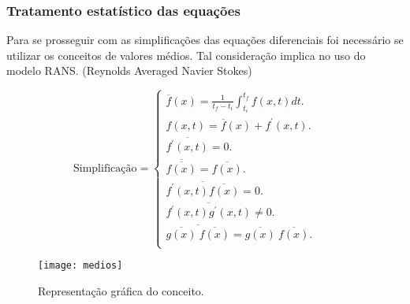 \documentclass[xcolor=dvipsnames,10pt,aspectratio=169]{beamer}
\begin{document}
		
		
		\begin{frame}
			\frametitle{Tratamento estatístico das equações}
			Para se prosseguir com as simplificações das equações diferenciais foi necessário se utilizar os conceitos de valores médios. Tal consideração implica no uso do modelo RANS. (Reynolds Averaged Navier Stokes)
			\\
			\begin{minipage}[h!]{0.45\textwidth}
				\begin{equation*}
				\label{ola}
				\text{Simplificação}=
				\begin{cases}
				\overline{f}({x})=\frac{1}{t_f - t_i} \int_{t_i}^{t_f} f({x} , t) dt.      & \quad  \\
				f({x} , t) = \overline{f}({x}) + f^\prime ({x} ,t) . & \quad   \\
				\overline{f^\prime ({x} ,t)} = 0 . & \quad   \\
				\overline{\overline{f({x})}} = \overline{f({x})} . & \quad   \\
				\overline{f^\prime ({x} ,t)\overline{f({x})}} = 0 .& \quad   \\
				\overline{f^\prime ({x} ,t)g^\prime ({x} ,t)} \neq 0 . & \quad   \\
				\overline{  \overline{g({x})} \ \overline{f({x})}  } = {\overline{g({x})}} \ {\overline{f({x})}} . & \quad   \\
				\end{cases}
				\end{equation*}
			\end{minipage}\hfill
			\begin{minipage}[h!]{0.45\textwidth}
				\begin{figure}
					\centering
					\texttt{[image: medios]}
					\caption{Representação gráfica do conceito.}
					\label{medios}
				\end{figure}
			\end{minipage}
	     	\\
		\end{frame}
	
	
	
	
	
\end{document}
